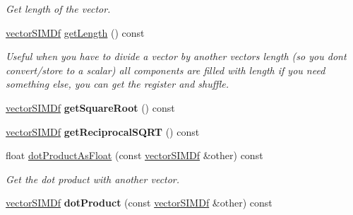 \begin{DoxyCompactItemize}
\begin{DoxyCompactList}\small\item\em Get length of the vector. \end{DoxyCompactList}\item 
\hyperlink{classirr_1_1core_1_1vectorSIMDf}{vector\+S\+I\+M\+Df} \hyperlink{classirr_1_1core_1_1vectorSIMDf_aa8e515b53a167e396364c61b45f36788}{get\+Length} () const \hypertarget{classirr_1_1core_1_1vectorSIMDf_aa8e515b53a167e396364c61b45f36788}{}\label{classirr_1_1core_1_1vectorSIMDf_aa8e515b53a167e396364c61b45f36788}

\begin{DoxyCompactList}\small\item\em Useful when you have to divide a vector by another vector\textquotesingle{}s length (so you dont convert/store to a scalar) all components are filled with length if you need something else, you can get the register and shuffle. \end{DoxyCompactList}\item 
\hyperlink{classirr_1_1core_1_1vectorSIMDf}{vector\+S\+I\+M\+Df} {\bfseries get\+Square\+Root} () const \hypertarget{classirr_1_1core_1_1vectorSIMDf_af569aed307c77b7161628b828ce2f155}{}\label{classirr_1_1core_1_1vectorSIMDf_af569aed307c77b7161628b828ce2f155}

\item 
\hyperlink{classirr_1_1core_1_1vectorSIMDf}{vector\+S\+I\+M\+Df} {\bfseries get\+Reciprocal\+S\+Q\+RT} () const \hypertarget{classirr_1_1core_1_1vectorSIMDf_ad18b8e85773b038a38d9359f173dd3c9}{}\label{classirr_1_1core_1_1vectorSIMDf_ad18b8e85773b038a38d9359f173dd3c9}

\item 
float \hyperlink{classirr_1_1core_1_1vectorSIMDf_a0f61bd94fd41aff8249bfacc3b400b9c}{dot\+Product\+As\+Float} (const \hyperlink{classirr_1_1core_1_1vectorSIMDf}{vector\+S\+I\+M\+Df} \&other) const \hypertarget{classirr_1_1core_1_1vectorSIMDf_a0f61bd94fd41aff8249bfacc3b400b9c}{}\label{classirr_1_1core_1_1vectorSIMDf_a0f61bd94fd41aff8249bfacc3b400b9c}

\begin{DoxyCompactList}\small\item\em Get the dot product with another vector. \end{DoxyCompactList}\item 
\hyperlink{classirr_1_1core_1_1vectorSIMDf}{vector\+S\+I\+M\+Df} {\bfseries dot\+Product} (const \hyperlink{classirr_1_1core_1_1vectorSIMDf}{vector\+S\+I\+M\+Df} \&other) const \hypertarget{classirr_1_1core_1_1vectorSIMDf_a55838f3871012d9032e24071a1f2b725}{}\label{classirr_1_1core_1_1vectorSIMDf_a55838f3871012d9032e24071a1f2b725}


\end{DoxyCompactItemize}
